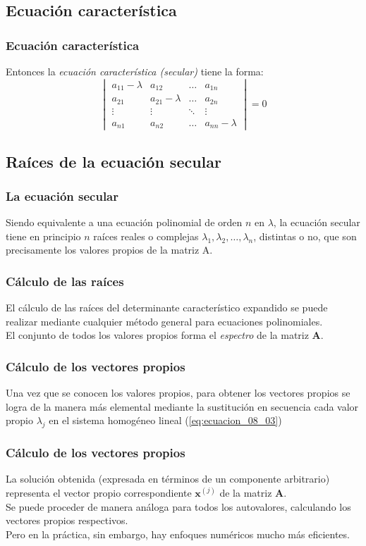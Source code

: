 \subsection*{Ecuación característica}
\begin{frame}
\frametitle{Ecuación característica}
Entonces la \emph{ecuación característica (secular)} tiene la forma:
\begin{equation}
\begin{vmatrix}
a_{11} - \lambda & a_{12} & \ldots & a_{1n} \\
a_{21} & a_{21} - \lambda & \ldots & a_{2n} \\
\vdots & \vdots & \ddots & \vdots \\
a_{n1} & a_{n2} & \ldots & a_{nn} - \lambda
\end{vmatrix}
= 0
\label{eq:ecuacion_08_06}
\end{equation}
\end{frame}
\subsection*{Raíces de la ecuación secular}
\begin{frame}
\frametitle{La ecuación secular}
Siendo equivalente a una ecuación polinomial de orden $n$ en $\lambda$, la ecuación secular tiene en principio $n$ raíces reales o complejas $\lambda_{1}, \lambda_{2}, \ldots, \lambda_{n}$, distintas o no, que son precisamente los valores propios de la matriz A.
\end{frame}
\begin{frame}
\frametitle{Cálculo de las raíces}
El cálculo de las raíces del determinante característico expandido se puede realizar mediante cualquier método general para ecuaciones polinomiales.
\\
\bigskip
El conjunto de todos los valores propios forma el \emph{espectro} de la matriz $\mathbf{A}$.
\end{frame}
\begin{frame}
\frametitle{Cálculo de los vectores propios}
Una vez que se conocen los valores propios, para obtener los vectores propios se logra de la manera más elemental mediante la sustitución en secuencia cada valor propio $\lambda_{j}$ en el sistema homogéneo lineal (\ref{eq:ecuacion_08_03})
\end{frame}
\begin{frame}
\frametitle{Cálculo de los vectores propios}
La solución obtenida (expresada en términos de un componente arbitrario) representa el vector propio correspondiente $\mathbf{x}^{(j)}$ de la matriz $\mathbf{A}$.
\\
\bigskip
Se puede proceder de manera análoga para todos los autovalores, calculando los vectores propios respectivos.
\\
\bigskip
Pero en la práctica, sin embargo, hay enfoques numéricos mucho más eficientes.
\end{frame}
